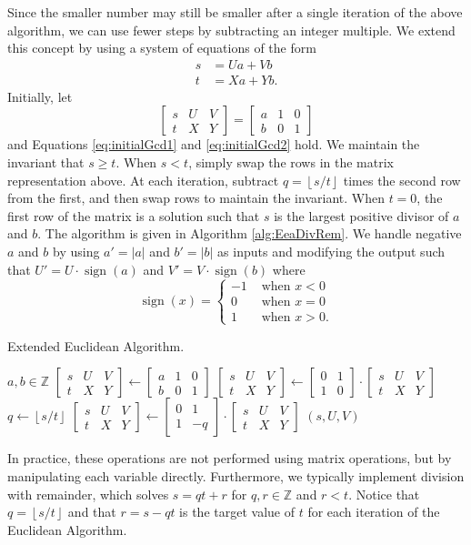 \documentclass{ucalgthes1}
\theoremstyle{plain}
\theoremstyle{definition}
\DeclareMathOperator{\sign}{sign}
\newcommand{\ZZ}{\mathbb{Z}}
\newcommand{\matrixtt}[4]{\left[ \begin{array}{rr} #1 & #2 \\ #3 & #4 \end{array} \right]}
\newcommand{\matrixThreeTwo}[6]{\left[ \begin{array}{rrr} #1 & #2 & #3 \\ #4 & #5 & #6 \end{array} \right]}
\newcommand{\floor}[1]{\left\lfloor #1 \right\rfloor}
\begin{document}
Since the smaller number may still be smaller after a single iteration of the above algorithm, we can use fewer steps by subtracting an integer multiple. We extend this concept by using a system of equations of the form
\begin{align}
s &= Ua + Vb \label{eq:initialGcd1} \\
t &= Xa + Yb. \label{eq:initialGcd2}
\end{align}
Initially, let
\[
\matrixThreeTwo{s}{U}{V}{t}{X}{Y} = \matrixThreeTwo{a}{1}{0}{b}{0}{1}
\]
and Equations \ref{eq:initialGcd1} and \ref{eq:initialGcd2} hold.  We maintain the invariant that $s \ge t$.  When $s < t$, simply swap the rows in the matrix representation above.  At each iteration, subtract $q = \floor{s/t}$ times the second row from the first, and then swap rows to maintain the invariant.  When $t=0$, the first row of the matrix is a solution such that $s$ is the largest positive divisor of $a$ and $b$.  The algorithm is given in Algorithm \ref{alg:EeaDivRem}.  We handle negative $a$ and $b$ by using $a' = |a|$ and $b' = |b|$ as inputs and modifying the output such that $U' = U \cdot \sign(a)$ and $V' = V \cdot \sign(b)$ where
\[
	\sign(x) = \begin{cases}
		-1 & \textrm{ when } x < 0 \\
		0 & \textrm{ when } x = 0 \\
		1 & \textrm{ when } x > 0.
	\end{cases}
\]

\begin{algorithm}[h]
\caption{Extended Euclidean Algorithm.}
\label{alg:EeaDivRem}
\begin{algorithmic}[1]
\REQUIRE $a,b \in \ZZ$
\STATE $\matrixThreeTwo{s}{U}{V}{t}{X}{Y} \gets 
        \matrixThreeTwo{a}{1}{0}{b}{0}{1}$
	\STATE $\matrixThreeTwo{s}{U}{V}{t}{X}{Y} \gets
	        \matrixtt{0}{1}{1}{0} \cdot \matrixThreeTwo{s}{U}{V}{t}{X}{Y}$
\ENDIF
{}
	\STATE $q \gets \floor{s / t}$
	\STATE $\matrixThreeTwo{s}{U}{V}{t}{X}{Y} \gets \matrixtt{0}{1}{1}{-q} \cdot
		    \matrixThreeTwo{s}{U}{V}{t}{X}{Y}$ 
\ENDWHILE
\RETURN $(s, U, V)$ 
\end{algorithmic}
\end{algorithm}

In practice, these operations are not performed using matrix operations, but by manipulating each variable directly.  Furthermore, we typically implement division with remainder, which solves $s = qt + r$ for $q,r \in \ZZ$ and $r < t$.  Notice that $q = \floor{s/t}$ and that $r = s - qt$ is the target value of $t$ for each iteration of the Euclidean Algorithm.  
\end{document}
